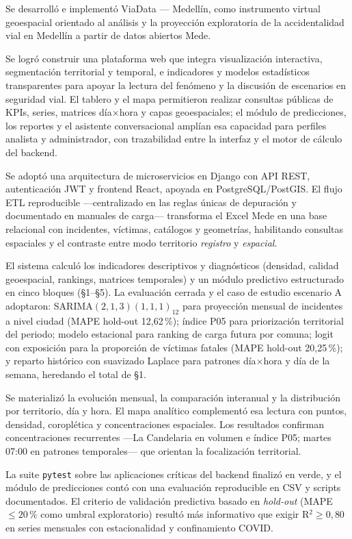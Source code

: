 Se desarrolló e implementó ViaData — Medellín, como instrumento virtual geoespacial orientado al análisis y la proyección exploratoria de la accidentalidad vial en Medellín a partir de datos abiertos Mede.

Se logró construir una plataforma web que integra visualización interactiva, segmentación territorial y temporal, e indicadores y modelos estadísticos transparentes para apoyar la lectura del fenómeno y la discusión de escenarios en seguridad vial. El tablero y el mapa permitieron realizar consultas públicas de KPIs, series, matrices día$\times$hora y capas geoespaciales; el módulo de predicciones, los reportes y el asistente conversacional amplían esa capacidad para perfiles analista y administrador, con trazabilidad entre la interfaz y el motor de cálculo del backend.

Se adoptó una arquitectura de microservicios en Django con API REST, autenticación JWT y frontend React, apoyada en PostgreSQL/PostGIS. El flujo ETL reproducible ---centralizado en las reglas únicas de depuración y documentado en manuales de carga--- transforma el Excel Mede en una base relacional con incidentes, víctimas, catálogos y geometrías, habilitando consultas espaciales y el contraste entre modo territorio \textit{registro} y \textit{espacial}.

El sistema calculó los indicadores descriptivos y diagnósticos (densidad, calidad geoespacial, rankings, matrices temporales) y un módulo predictivo estructurado en cinco bloques (§1--§5). La evaluación cerrada y el caso de estudio escenario A adoptaron: SARIMA$(2,1,3)(1,1,1)_{12}$ para proyección mensual de incidentes a nivel ciudad (MAPE hold-out 12,62\,\%); índice P05 para priorización territorial del periodo; modelo estacional para ranking de carga futura por comuna; logit con exposición para la proporción de víctimas fatales (MAPE hold-out 20,25\,\%); y reparto histórico con suavizado Laplace para patrones día$\times$hora y día de la semana, heredando el total de §1.

Se materializó la evolución mensual, la comparación interanual y la distribución por territorio, día y hora. El mapa analítico complementó esa lectura con puntos, densidad, coroplética y concentraciones espaciales. Los resultados confirman concentraciones recurrentes ---La Candelaria en volumen e índice P05; martes 07:00 en patrones temporales--- que orientan la focalización territorial.

La suite \texttt{pytest} sobre las aplicaciones críticas del backend finalizó en verde, y el módulo de predicciones contó con una evaluación reproducible en CSV y scripts documentados. El criterio de validación predictiva basado en \textit{hold-out} (MAPE $\leq 20\,\%$ como umbral exploratorio) resultó más informativo que exigir R$^2 \geq 0{,}80$ en series mensuales con estacionalidad y confinamiento COVID.


